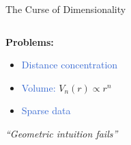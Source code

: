 \documentclass{beamer}
\begin{document}
\begin{frame}{The Curse of Dimensionality}
\begin{columns}[T]
\begin{column}{0.48\textwidth}
\vspace{0.3cm}
\textcolor{upcgray}{\textbf{Problems:}}
\begin{itemize}
    \small
    \item \textcolor{highlight}{Distance concentration}
    \item \textcolor{highlight}{Volume:} $V_n(r) \propto r^n$
    \item \textcolor{highlight}{Sparse data}
\end{itemize}

\vspace{0.2cm}
\centering
\small\textit{\color{upcblue}``Geometric intuition fails''}
\end{column}
\end{columns}
\end{frame}
\end{document}
